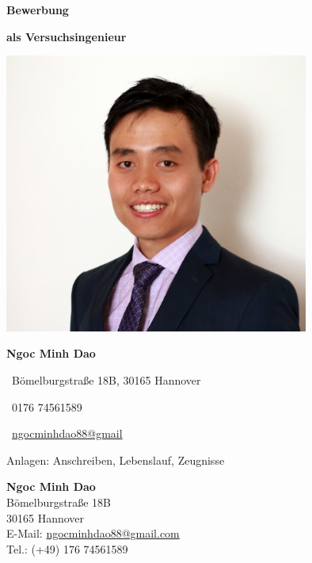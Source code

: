 \documentclass[11pt,a4paper]{article}
\newcommand{\JobName}{Versuchsingenieur}
\begin{document}
\pagestyle{empty}

\begin{center}
    \textbf{\fontsize{40}{48} \selectfont Bewerbung}
    \vspace{1em}

    \textbf{\huge als \JobName}

    \includegraphics[width=10cm]{./bilde/bewerbungsfoto_small.jpg}
    \vspace{1em}

    \textbf{\fontsize{32}{38} \selectfont Ngoc Minh Dao}

    \fontsize{20}{24} \selectfont \faHome~Bömelburgstraße 18B, 30165 Hannover
    \vspace{1em}

    \faPhone~0176 74561589

    \faEnvelope~\href{mailto:ngocminhdao88@gmail}{ngocminhdao88@gmail}

    \vfill
    Anlagen: Anschreiben, Lebenslauf, Zeugnisse

\end{center}

\newpage

\begin{flushleft}
    \textbf{Ngoc Minh Dao}\\
    Bömelburgstraße 18B\\
    30165 Hannover\\
    E-Mail: \href{mailto:ngocminhdao88@gmail.com}{ngocminhdao88@gmail.com}\\
    Tel.: (+49) 176 74561589
\end{flushleft}
\end{document}
